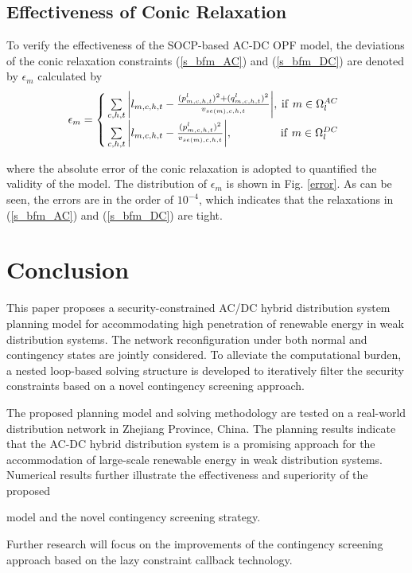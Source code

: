 \documentclass[a4paper,fleqn]{cas-dc}
\begin{document}
{\color{blue}
\subsection{Effectiveness of Conic Relaxation}

To verify the effectiveness of the SOCP-based AC-DC OPF model, the deviations 
of the conic relaxation constraints (\ref{s_bfm_AC}) and (\ref{s_bfm_DC}) are 
denoted by $ \epsilon_{m} $ calculated by
\begin{align}
    \epsilon_{m} =
    \left\{\!\!
        \begin{array}{lr}
        \sum\limits_{c,h,t} \left| l_{m,c,h,t} - 
        \frac{(p_{m,c,h,t}^{l})^{2} + (q_{m,c,h,t}^{l})^{2}}
        {v_{se(m),c,h,t}} \right| \!, 
        & \!\!\!\! {\rm if} \ m \in \Omega_{l}^{AC} \\
        \sum\limits_{c,h,t} \left| l_{m,c,h,t} - 
        \frac{(p_{m,c,h,t}^{l})^{2}}{v_{se(m),c,h,t}} \right| \!, 
        & \!\!\!\! {\rm if} \ m \in \Omega_{l}^{DC}
        \end{array}
    \right.
\end{align}

\noindent where the absolute error of the conic relaxation is adopted to 
quantified the validity of the model. The distribution of $ \epsilon_{m} $
is shown in Fig. \ref{error}. As can be seen, the errors are in the order of
$ 10^{-4} $, which indicates that the relaxations in (\ref{s_bfm_AC}) and 
(\ref{s_bfm_DC}) are tight.

}

\section{Conclusion}

This paper proposes a security-constrained AC/DC hybrid distribution system 
planning model for accommodating high penetration of renewable energy in weak 
distribution systems. The network reconfiguration under both normal and 
contingency states are jointly considered. To alleviate the computational 
burden, a nested loop-based solving structure is developed to iteratively 
filter the security constraints based on a novel contingency screening 
approach.

The proposed planning model and solving methodology are tested on a 
real-world distribution network in Zhejiang Province, China. The planning 
results indicate that the AC-DC hybrid distribution system is a promising 
approach for the accommodation of large-scale renewable energy in weak 
distribution systems. Numerical results further illustrate the effectiveness 
and superiority of the proposed 
{\color{blue}
model and the novel contingency screening strategy.

Further research will focus on the improvements of the contingency screening 
approach based on the lazy constraint callback technology.
}
\end{document}
